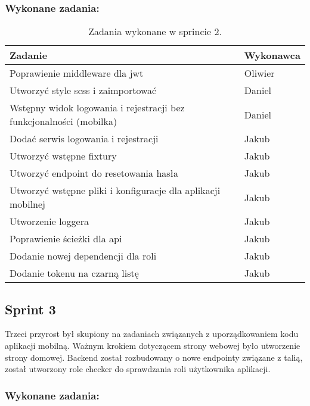 \subsubsection{Wykonane zadania:}

\begin{table}[H]
\centering
\begin{tabularx}{\textwidth}{|p{}|X|}
    \hline
    \textbf{Zadanie} & \textbf{Wykonawca} \\
    \hline
    [BACKEND] Poprawienie middleware dla jwt & Oliwier \\
    \hline
    [MOBILE] Utworzyć style scss i zaimportować & Daniel \\
    \hline
    [MOBILE] Wstępny widok logowania i rejestracji bez funkcjonalności (mobilka) & Daniel \\
    \hline
    [MOBILE] Dodać serwis logowania i rejestracji & Jakub \\
    \hline
    [BACKEND] Utworzyć wstępne fixtury & Jakub \\
    \hline
    [BACKEND] Utworzyć endpoint do resetowania hasła & Jakub \\
    \hline
    [MOBILE] Utworzyć wstępne pliki i konfiguracje dla aplikacji mobilnej & Jakub \\
    \hline
    [BACKEND] Utworzenie loggera & Jakub \\
    \hline
    [BACKEND] Poprawienie ścieżki dla api & Jakub \\
    \hline
    [BACKEND] Dodanie nowej dependencji dla roli & Jakub \\
    \hline
    [BACKEND] Dodanie tokenu na czarną listę & Jakub \\
    \hline
\end{tabularx}
    \caption{Zadania wykonane w sprincie 2.}
\end{table}

\subsection{Sprint 3}

Trzeci przyrost był skupiony na zadaniach związanych z uporządkowaniem kodu aplikacji mobilną. Ważnym krokiem dotyczącem strony webowej było utworzenie strony domowej. Backend został rozbudowany o nowe endpointy związane z talią, został utworzony role checker do sprawdzania roli użytkownika aplikacji.

\subsubsection{Wykonane zadania:}

